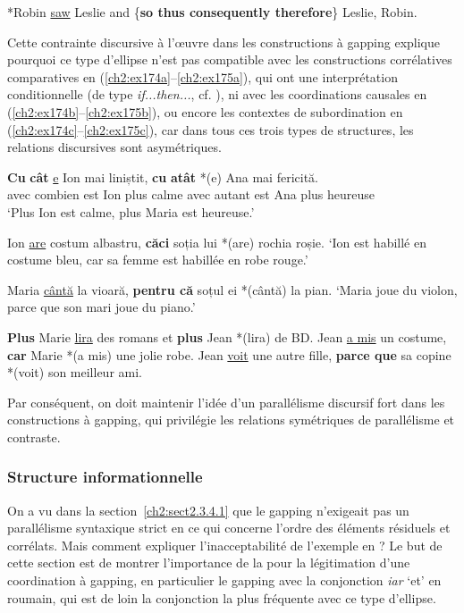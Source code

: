 \ea \label{ch2:ex173}
*Robin \uline{saw} Leslie and \{\textbf{so {\textbar} thus {\textbar} consequently {\textbar} therefore}\} Leslie, Robin.
\z

Cette contrainte discursive à l’œuvre dans les constructions à gapping explique pourquoi ce type d’ellipse n’est pas compatible avec les constructions corrélatives comparatives en (\ref{ch2:ex174a}--\ref{ch2:ex175a}), qui ont une interprétation conditionnelle (de type \textit{if...then...}, cf. \citealt{Beck1997}), ni avec les coordinations causales en (\ref{ch2:ex174b}--\ref{ch2:ex175b}), ou encore les contextes de subordination en (\ref{ch2:ex174c}--\ref{ch2:ex175c}), car dans tous ces trois types de structures, les relations discursives sont asymétriques. 

\ea
\ea 
\gll \textbf{Cu} \textbf{cât}  \uline{e}  Ion  mai  liniștit,  \textbf{cu} \textbf{atât}  *(e)  Ana  mai  fericită. \label{ch2:ex174a}\\ 
avec  combien  est  Ion  plus  calme  avec  autant  est  Ana  plus  heureuse\\
\glt ‘Plus Ion est calme, plus Maria est heureuse.’  

\ex Ion \uline{are} costum albastru, \textbf{căci} soția lui *(are) rochia roșie. \label{ch2:ex174b} 
\glt ‘Ion est habillé en costume bleu, car sa femme est habillée en robe rouge.’ 

\ex Maria \uline{cântă} la vioară, \textbf{pentru că} soțul ei *(cântă) la pian. \label{ch2:ex174c} 
\glt  ‘Maria joue du violon, parce que son mari joue du piano.’  
\z
\z


\ea
\ea \textbf{Plus} Marie \uline{lira} des romans et \textbf{plus} Jean *(lira) de BD. \label{ch2:ex175a}
\ex Jean \uline{a mis} un costume, \textbf{car} Marie *(a mis) une jolie robe. \label{ch2:ex175b}  
\ex Jean \uline{voit} une autre fille, \textbf{parce que} sa copine *(voit) son meilleur ami. \label{ch2:ex175c}
\z
\z

Par conséquent, on doit maintenir l’idée d’un parallélisme discursif fort dans les constructions à gapping, qui privilégie les relations symétriques de parallélisme et contraste. 


\subsubsection{Structure informationnelle} \label{ch2:sect2.3.4.4}


On a vu dans la section~\ref{ch2:sect2.3.4.1} que le gapping n’exigeait pas un parallélisme syntaxique strict en ce qui concerne l’ordre des éléments résiduels et corrélats. Mais comment expliquer l’inacceptabilité de l’exemple en  ? Le but de cette section est de montrer l’importance de la  pour la légitimation d’une coordination à gapping, en particulier le gapping avec la conjonction \textit{iar} ‘et’ en roumain, qui est de loin la conjonction la plus fréquente avec ce type d’ellipse. 

